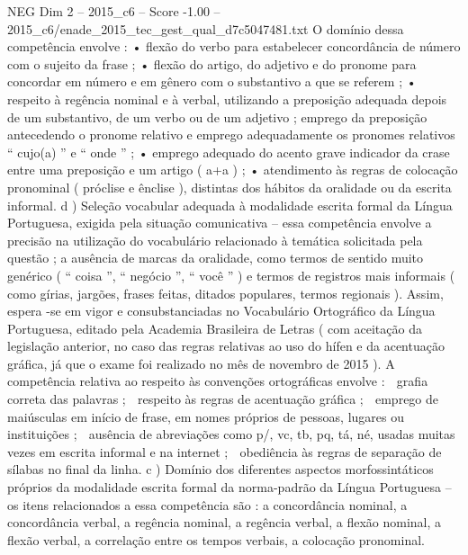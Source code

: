 \begin{textsample}{NEG Dim 2 – 2015\_c6 – Score -1.00 – 2015\_c6/enade\_2015\_tec\_gest\_qual\_d7c5047481.txt}
O domínio dessa competência envolve : • flexão do verbo para estabelecer concordância de número com o sujeito da frase ; • flexão do artigo, do adjetivo e do pronome para concordar em número e em gênero com o substantivo a que se referem ; • respeito à regência nominal e à verbal, utilizando a preposição adequada depois de um substantivo, de um verbo ou de um adjetivo ; emprego da preposição antecedendo o pronome relativo e emprego adequadamente os pronomes relativos “ cujo(a) ” e “ onde ” ; • emprego adequado do acento grave indicador da crase entre uma preposição e um artigo ( a+a ) ; • atendimento às regras de colocação pronominal ( próclise e ênclise ), distintas dos hábitos da oralidade ou da escrita informal. d ) Seleção vocabular adequada à modalidade escrita formal da Língua Portuguesa, exigida pela situação comunicativa – essa competência envolve a precisão na utilização do vocabulário relacionado à temática solicitada pela questão ; a ausência de marcas da oralidade, como termos de sentido muito genérico ( “ coisa ”, “ negócio ”, “ você ” ) e termos de registros mais informais ( como gírias, jargões, frases feitas, ditados populares, termos regionais ).
Assim, espera -se em vigor e consubstanciadas no Vocabulário Ortográfico da Língua Portuguesa, editado pela Academia Brasileira de Letras ( com aceitação da legislação anterior, no caso das regras relativas ao uso do hífen e da acentuação gráfica, já que o exame foi realizado no mês de novembro de 2015 ).
A competência relativa ao respeito às convenções ortográficas envolve :  grafia correta das palavras ;  respeito às regras de acentuação gráfica ;  emprego de maiúsculas em início de frase, em nomes próprios de pessoas, lugares ou instituições ;  ausência de abreviações como p/, vc, tb, pq, tá, né, usadas muitas vezes em escrita informal e na internet ;  obediência às regras de separação de sílabas no final da linha. c ) Domínio dos diferentes aspectos morfossintáticos próprios da modalidade escrita formal da norma-padrão da Língua Portuguesa – os itens relacionados a essa competência são : a concordância nominal, a concordância verbal, a regência nominal, a regência verbal, a flexão nominal, a flexão verbal, a correlação entre os tempos verbais, a colocação pronominal.

\end{textsample}
